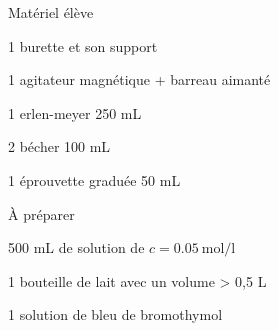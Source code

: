 
\begin{boiteMateriel}{Matériel élève}
  \effectifTerminaleStss

  \begin{listePoints}
    \item 1 burette et son support
    \item 1 agitateur magnétique + barreau aimanté
    \item 1 erlen-meyer 250 mL
    \item 2 bécher 100 mL
    \item 1 éprouvette graduée 50 mL
  \end{listePoints}
\end{boiteMateriel}

\begin{boiteMateriel}{À préparer}
  \begin{listePoints}
    \item 500 mL de solution de  $c = \qty{0,05}{\mol\per\litre}$
    \item 1 bouteille de lait avec un volume > 0,5 L
    \item 1 solution de bleu de bromothymol
  \end{listePoints}
\end{boiteMateriel}
